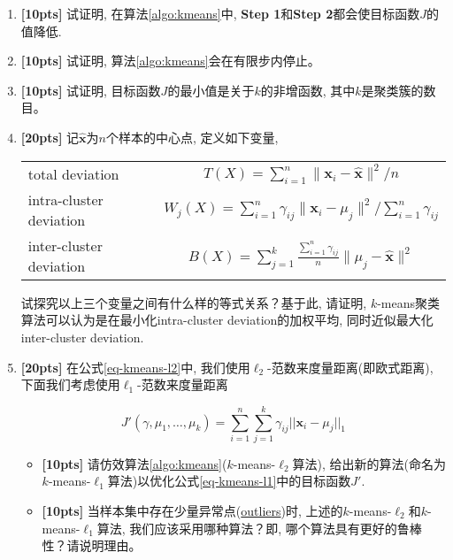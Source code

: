 \documentclass[a4paper,UTF8]{article}
\numberwithin{equation}{section}
\theoremstyle{definition}
\begin{document}
\begin{enumerate}[(1)]

\item \textbf{[10pts]} 试证明, 在算法\ref{algo:kmeans}中, \textbf{Step 1}和\textbf{Step 2}都会使目标函数$J$的值降低.

\item \textbf{[10pts]} 试证明, 算法\ref{algo:kmeans}会在有限步内停止。

\item {\textbf{[10pts]} 试证明, 目标函数$J$的最小值是关于$k$的非增函数, 其中$k$是聚类簇的数目。}

\item {\textbf{[20pts]} 记$\hat{\mathbf{x}}$为$n$个样本的中心点, 定义如下变量,
\begin{table}[h]
\centering
\label{table:equation}
\begin{tabular}{ l | c }
  \hline			
total deviation & $T(X) = \sum_{i=1}^n \lVert \mathbf x_i - \hat{\mathbf x}\rVert^2/n$ \\
intra-cluster deviation & $W_j(X) = \sum_{i=1}^n \gamma_{ij} \lVert\mathbf x_i - \mu_j \rVert^2/\sum_{i=1}^n \gamma_{ij}$ \\
inter-cluster deviation & $B(X) = \sum_{j=1}^k \frac{ \sum_{i=1}^n \gamma_{ij}}{n}  \lVert\mu_j -\hat{\mathbf x} \rVert^2$\\
  \hline  
\end{tabular}
\end{table}

试探究以上三个变量之间有什么样的等式关系？基于此, 请证明, $k$-means聚类算法可以认为是在最小化intra-cluster deviation的加权平均, 同时近似最大化inter-cluster deviation.}

\item { \textbf{[20pts]} 在公式\eqref{eq-kmeans-l2}中, 我们使用$\ell_2$-范数来度量距离(即欧式距离), 下面我们考虑使用$\ell_1$-范数来度量距离

\begin{equation}
\label{eq-kmeans-l1}
J'(\gamma, \mu_1,\ldots,\mu_k) = \sum_{i=1}^n \sum_{j=1}^k \gamma_{ij}||\mathbf x_i - \mu_j||_1
\end{equation}

\begin{itemize} 
\item \textbf{[10pts]} 请仿效算法\ref{algo:kmeans}($k$-means-$\ell_2$算法), 给出新的算法(命名为$k$-means-$\ell_1$算法)以优化公式\ref{eq-kmeans-l1}中的目标函数$J'$.
\item \textbf{[10pts]} 当样本集中存在少量异常点(\href{https://en.wikipedia.org/wiki/Outlier}{outliers})时, 上述的$k$-means-$\ell_2$和$k$-means-$\ell_1$算法, 我们应该采用哪种算法？即, 哪个算法具有更好的鲁棒性？请说明理由。
\end{itemize}}

\end{enumerate}
\end{document}
